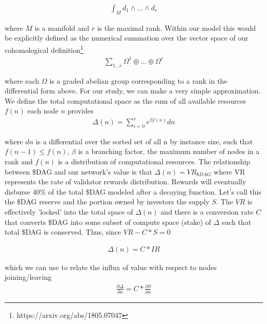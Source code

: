 \documentclass{article}
\begin{document}
\begin{equation*} \label{eq1}
\begin{split}
\int_M d_1\wedge \dots \wedge d_r
\end{split}
\end{equation*}

where $M$ is a manifold and $r$ is the maximal rank. Within our model this would be explicitly defined as the numerical summation over the vector space of our cohomological definition\footnote{https://arxiv.org/abs/1805.07047}
\begin{equation*} \label{eq1}
\begin{split}
\sum_{1 \dots r} \Omega^1 \oplus \dots \oplus \Omega^r
\end{split}
\end{equation*}

where each $\Omega$ is a graded abelian group corresponding to a rank in the differential form above. For our study, we can make a very simple approximation. We define the total computational space as the sum of all available resources $f(n)$ each node $n$ provides
\begin{equation*} \label{eq1}
\begin{split}
\Delta(n) = \sum_{i=0}^r e^{\beta f(n)} dn
\end{split}
\end{equation*}

where $dn$ is a differential over the sorted set of all n by instance size, such that $f(n-1) \leq f(n)$, $\beta$ is a branching factor, the maximum number of nodes in a rank and $f(n)$ is a distribution of computational resources. The relationship between \$DAG and our network's value is that $\Delta(n) = VR_{\$DAG}$ where VR represents the rate of validator rewards distribution. Rewards will eventually disburse 40\% of the total \$DAG modeled after a decaying function.  Let's call this the \$DAG reserve and the portion owned by investors the supply $S$. The $VR$ is effectively 'locked' into the total space of $\Delta(n)$ and there is a conversion rate $C$ that converts \$DAG into some subset of compute space (stake) of $\Delta$ such that total \$DAG is conserved. Thus, since $VR - C*S = 0$ 

\begin{equation*} \label{eq1}
\begin{split}
\Delta(n) = C* IR
\end{split}
\end{equation*}

which we can use to relate the influx of value with respect to nodes joining/leaving
\begin{equation*} \label{eq1}
\begin{split}
\frac{\partial \Delta}{\partial n} = C* \frac{\partial S}{\partial n}
\end{split}
\end{equation*}
\end{document}
